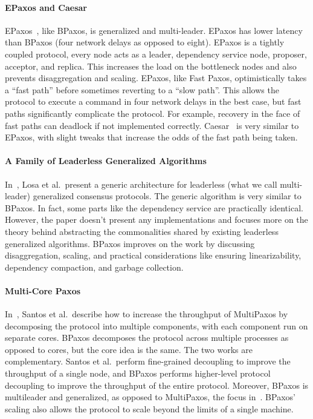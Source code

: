 \paragraph{EPaxos and Caesar}
EPaxos~\cite{moraru2013there, moraru2013proof}, like BPaxos, is generalized and
multi-leader. EPaxos has lower latency than BPaxos (four network delays as
opposed to eight). EPaxos is a tightly coupled protocol, every node acts as a
leader, dependency service node, proposer, acceptor, and replica. This
increases the load on the bottleneck nodes and also prevents disaggregation and
scaling. EPaxos, like Fast Paxos, optimistically takes a ``fast path'' before
sometimes reverting to a ``slow path''. This allows the protocol to execute a
command in four network delays in the best case, but fast paths significantly
complicate the protocol. For example, recovery in the face of fast paths can
deadlock if not implemented correctly. Caesar~\cite{arun2017speeding} is very
similar to EPaxos, with slight tweaks that increase the odds of the fast path
being taken.

\paragraph{A Family of Leaderless Generalized Algorithms}
In~\cite{losa2016brief}, Losa et al.\ present a generic architecture for
leaderless (what we call multi-leader) generalized consensus protocols. The
generic algorithm is very similar to BPaxos. In fact, some parts like the
dependency service are practically identical. However, the paper doesn't
present any implementations and focuses more on the theory behind abstracting
the commonalities shared by existing leaderless generalized algorithms. BPaxos
improves on the work by discussing disaggregation, scaling, and practical
considerations like ensuring linearizability, dependency compaction, and
garbage collection.

\paragraph{Multi-Core Paxos}
In~\cite{santos2013achieving}, Santos et al.\ describe how to increase the
throughput of MultiPaxos by decomposing the protocol into multiple components,
with each component run on separate cores. BPaxos decomposes the protocol
across multiple processes as opposed to cores, but the core idea is the same.
The two works are complementary. Santos et al.\ perform fine-grained decoupling
to improve the throughput of a single node, and BPaxos performs higher-level
protocol decoupling to improve the throughput of the entire protocol. Moreover,
BPaxos is multileader and generalized, as opposed to MultiPaxos, the focus
in~\cite{santos2013achieving}. BPaxos' scaling also allows the protocol to
scale beyond the limits of a single machine.

